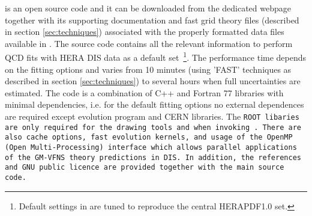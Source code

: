 
\fitter is an open source code and it can be downloaded from the dedicated webpage \cite{herafitter:page}
together with its supporting documentation and 
fast grid theory files (described in section \ref{sec:techniques}) associated with the properly formatted data files available in \fitter.
The source code contains all the relevant information to perform QCD fits with HERA DIS data as a default 
set~\footnote{Default settings in \fitter are tuned to reproduce the central HERAPDF1.0 set.}. 
The performance time depends on the fitting options and varies from 10 minutes 
(using 'FAST' techniques as described in section \ref{sec:techniques}) to several hours when full uncertainties are estimated. The \fitter code is a combination of C++ and Fortran 77 libraries with minimal 
dependencies, i.e. for the default fitting options no external dependences are required except \qcdnum evolution program \cite{qcdnum} and CERN libraries. 
The \tt ROOT \rm  libaries are only required for the drawing tools and when invoking \applgrid\rm.  
There are also cache options, fast evolution kernels, and usage of the OpenMP (Open Multi-Processing)  interface which allows parallel applications of the GM-VFNS theory predictions in DIS. 
In addition, the \fitter references and GNU public licence are provided 
together with the main source code. 


